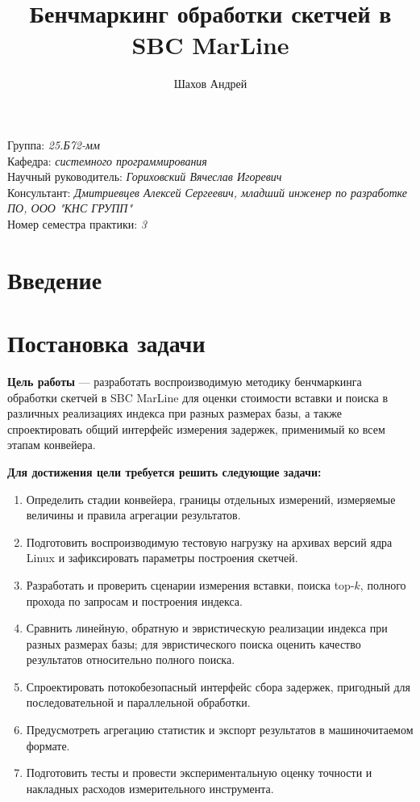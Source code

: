 \documentclass[a4paper]{article}
\title{Бенчмаркинг обработки скетчей в SBC MarLine}
\author{Шахов Андрей}
\date{}
\begin{document}
\maketitle

\begin{flushright}
    Группа: \emph{25.Б72-мм}\\
    Кафедра: \emph{системного программирования}\\
    Научный руководитель: \emph{Гориховский Вячеслав Игоревич}\\
    Консультант: \emph{Дмитриевцев Алексей Сергеевич, младший инженер по разработке ПО, ООО "КНС ГРУПП"}\\
    Номер семестра практики: \emph{3}
\end{flushright}

\section{Введение}

\section{Постановка задачи}

\textbf{Цель работы} --- разработать воспроизводимую методику бенчмаркинга обработки скетчей в SBC MarLine для оценки стоимости вставки и поиска в различных реализациях индекса при разных размерах базы, а также спроектировать общий интерфейс измерения задержек, применимый ко всем этапам конвейера.

\textbf{Для достижения цели требуется решить следующие задачи:}
\begin{enumerate}
    \item Определить стадии конвейера, границы отдельных измерений, измеряемые величины и правила агрегации результатов.
    \item Подготовить воспроизводимую тестовую нагрузку на архивах версий ядра Linux и зафиксировать параметры построения скетчей.
    \item Разработать и проверить сценарии измерения вставки, поиска top-$k$, полного прохода по запросам и построения индекса.
    \item Сравнить линейную, обратную и эвристическую реализации индекса при разных размерах базы; для эвристического поиска оценить качество результатов относительно полного поиска.
    \item Спроектировать потокобезопасный интерфейс сбора задержек, пригодный для последовательной и параллельной обработки.
    \item Предусмотреть агрегацию статистик и экспорт результатов в машиночитаемом формате.
    \item Подготовить тесты и провести экспериментальную оценку точности и накладных расходов измерительного инструмента.
\end{enumerate}
\end{document}
